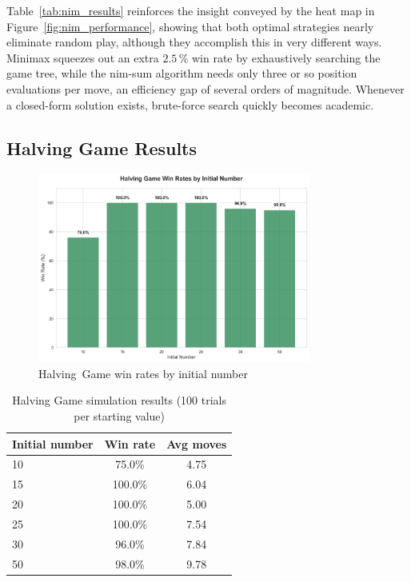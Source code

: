 \documentclass[12pt]{article}
\begin{document}
Table~\ref{tab:nim_results} reinforces the insight conveyed by the heat map in Figure~\ref{fig:nim_performance}, showing that both optimal strategies nearly eliminate random play, although they accomplish this in very different ways. Minimax squeezes out an extra \(2.5\,\%\) win rate by exhaustively searching the game tree, while the nim-sum algorithm needs only three or so position evaluations per move, an efficiency gap of several orders of magnitude. Whenever a closed-form solution exists, brute-force search quickly becomes academic.

\subsection{Halving Game Results}

\begin{figure}[H]
    \centering
    \includegraphics[width=0.8\textwidth]{output/images/halving_win_rates.png}
    \caption{Halving Game win rates by initial number}
    \label{fig:halving_win_rates}
\end{figure}

\begin{table}[H]
    \centering
    \begin{tabular}{lcc}
        \toprule
        \textbf{Initial number} & \textbf{Win rate} & \textbf{Avg moves} \\
        \midrule
        10 & 75.0\% & 4.75 \\
        15 & 100.0\% & 6.04 \\
        20 & 100.0\% & 5.00 \\
        25 & 100.0\% & 7.54 \\
        30 & 96.0\% & 7.84 \\
        50 & 98.0\% & 9.78 \\
        \bottomrule
    \end{tabular}
    \caption{Halving Game simulation results (100 trials per starting value)}
    \label{tab:halving_results}
\end{table}
\end{document}
